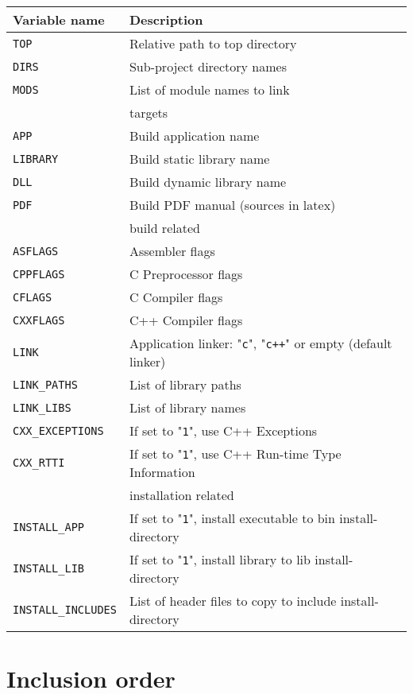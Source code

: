 \documentclass{article}
\newcommand{\var}[1]{{\tt #1}}
\newcommand{\val}[1]{"{\tt #1}"}
\begin{document}
\begin{tabular}{ll}
Variable name              & Description                       \\
\hline
\var{TOP}		   & Relative path to top directory    \\
\var{DIRS}		   & Sub-project directory names       \\
\var{MODS}                 & List of module names to link      \\
\hline
& targets \\
\hline
\var{APP}                  & Build application name              \\
\var{LIBRARY}              & Build static library name           \\
\var{DLL}                  & Build dynamic library name          \\
\var{PDF}		   & Build PDF manual (sources in latex) \\
\hline
& build related \\
\hline
\var{ASFLAGS}              & Assembler flags \\
\var{CPPFLAGS}		   & C Preprocessor flags \\
\var{CFLAGS}		   & C Compiler flags \\
\var{CXXFLAGS}		   & C++ Compiler flags \\
\var{LINK}                 & Application linker: \val{c}, \val{c++} or empty (default linker)\\
\var{LINK\_PATHS}	   & List of library paths \\
\var{LINK\_LIBS}	   & List of library names \\
\var{CXX\_EXCEPTIONS}      & If set to \val{1}, use C++ Exceptions                \\
\var{CXX\_RTTI}       	   & If set to \val{1}, use C++ Run-time Type Information \\
\hline
& installation related \\
\hline
\var{INSTALL\_APP}	   & If set to \val{1}, install executable to bin install-directory \\
\var{INSTALL\_LIB}	   & If set to \val{1}, install library to lib install-directory \\
\var{INSTALL\_INCLUDES}    & List of header files to copy to include install-directory \\
\end{tabular}

\pagebreak

\section{Inclusion order}
\end{document}
